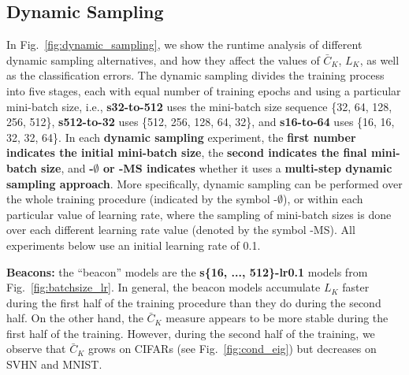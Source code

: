\documentclass[10pt,journal,compsoc]{IEEEtran}
\begin{document}
\subsection{Dynamic Sampling}

In Fig.~\ref{fig:dynamic_sampling}, we show the runtime analysis of different dynamic sampling alternatives, and how they affect the values of $\bar{C}_K$, $L_K$, as well as the classification errors. 
The dynamic sampling divides the training process into five stages, each with equal number of training epochs and using a particular mini-batch size, i.e., {\bf s32-to-512} uses the mini-batch size sequence \{32, 64, 128, 256, 512\}, 
{\bf s512-to-32} uses \{512, 256, 128, 64, 32\}, 
and {\bf s16-to-64} uses \{16, 16, 32, 32, 64\}.
In each \textbf{dynamic sampling} experiment, the \textbf{first number indicates the initial mini-batch size}, the \textbf{second indicates the final mini-batch size}, and \textbf{-$\emptyset$ or -MS indicates} whether it uses a \textbf{multi-step dynamic sampling approach}.
More specifically, dynamic sampling can be performed over the whole training procedure (indicated by the symbol -$\emptyset$), or within each particular value of learning rate, where the sampling of mini-batch sizes is done over each different learning rate value (denoted by the symbol -MS).
All experiments below use an initial learning rate of 0.1.

{\bf Beacons:}
the ``beacon'' models are the {\bf s\{16, ..., 512\}-lr0.1} models from Fig.~\ref{fig:batchsize_lr}.
In general, the beacon models accumulate $L_K$ faster during the first half of the training procedure than they do during the second half.
On the other hand, the $\bar{C}_K$ measure appears to be more stable during the first half of the training.
However, during the second half of the training, we observe that $\bar{C}_K$ grows on CIFARs (see Fig.~\ref{fig:cond_eig}) but decreases on SVHN and MNIST.
\end{document}
